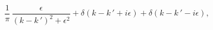 \begin{equation}\label{delta-}
\frac{1}{\pi}\,\frac{\epsilon}{(k-k\,')^2+\epsilon^2}+
\delta(k-k\,'+ i\epsilon)+\delta(k-k\,'- i\epsilon),
\end{equation}

